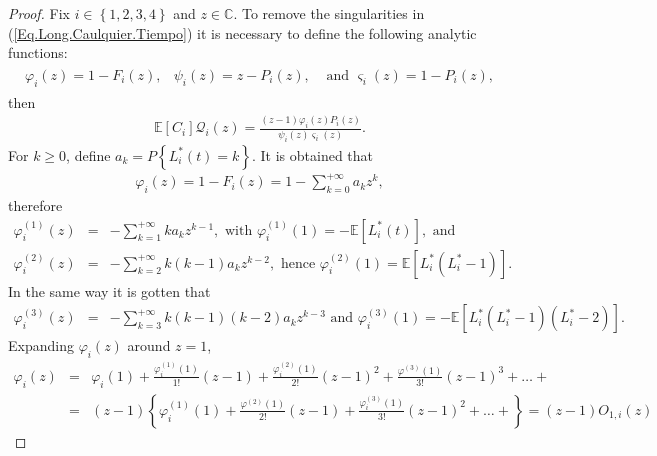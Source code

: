 \documentclass{article}
\newcommand{\esp}{\mathbb{E}}
\begin{document}
\begin{proof}
Fix $i\in\left\{1,2,3,4\right\}$ and $z\in\mathbb{C}$. To remove the singularities in (\ref{Eq.Long.Caulquier.Tiempo}) it is necessary to define the following analytic functions:
\begin{eqnarray}
\begin{array}{ccc}
\varphi_{i}\left(z\right)=1-F_{i}\left(z\right),&
\psi_{i}\left(z\right)=z-P_{i}\left(z\right),&\textrm{ and }
\varsigma_{i}\left(z\right)=1-P_{i}\left(z\right),
\end{array}
\end{eqnarray}
then
\begin{eqnarray}
\esp\left[C_{i}\right]\mathcal{Q}_{i}\left(z\right)=\frac{\left(z-1\right)\varphi_{i}\left(z\right)P_{i}\left(z\right)}{\psi_{i}\left(z\right)\varsigma_{i}\left(z\right)}.
\end{eqnarray}
For $k\geq0$, define $a_{k}=P\left\{L_{i}^{*}\left(t\right)=k\right\}$. It is obtained that
\begin{eqnarray*}
\varphi_{i}\left(z\right)=1-F_{i}\left(z\right)=1-\sum_{k=0}^{+\infty}a_{k}z^{k},
\end{eqnarray*}
therefore 
\begin{eqnarray*}
\varphi_{i}^{(1)}\left(z\right)&=&-\sum_{k=1}^{+\infty}ka_{k}z^{k-1},\textrm{ with }\varphi_{i}^{(1)}\left(1\right)=-\esp\left[L_{i}^{*}\left(t\right)\right],\textrm{ and}\\
\varphi_{i}^{(2)}\left(z\right)&=&-\sum_{k=2}^{+\infty}k(k-1)a_{k}z^{k-2},\textrm{ hence }\varphi_{i}^{(2)}\left(1\right)=\esp\left[L_{i}^{*}\left(L_{i}^{*}-1\right)\right].
\end{eqnarray*}
In the same way it is gotten that
\begin{eqnarray*}
\varphi_{i}^{(3)}\left(z\right)&=&-\sum_{k=3}^{+\infty}k(k-1)(k-2)a_{k}z^{k-3}\textrm{ and }\varphi_{i}^{(3)}\left(1\right)=-\esp\left[L_{i}^{*}\left(L_{i}^{*}-1\right)\left(L_{i}^{*}-2\right)\right].
\end{eqnarray*}
Expanding $\varphi_{i}\left(z\right)$ around $z=1$,
\begin{eqnarray*}
\varphi_{i}\left(z\right)&=&\varphi_{i}\left(1\right)+\frac{\varphi_{i}^{(1)}\left(1\right)}{1!}\left(z-1\right)+\frac{\varphi_{i}^{(2)}\left(1\right)}{2!}\left(z-1\right)^{2}+\frac{\varphi^{(3)}\left(1\right)}{3!}\left(z-1\right)^{3}+\ldots+\\
&=&\left(z-1\right)\left\{\varphi_{i}^{(1)}\left(1\right)+\frac{\varphi^{(2)}\left(1\right)}{2!}\left(z-1\right)+\frac{\varphi_{i}^{(3)}\left(1\right)}{3!}\left(z-1\right)^{2}+\ldots+\right\}=\left(z-1\right)O_{1,i}\left(z\right)

\end{eqnarray*}
\end{proof}
\end{document}

